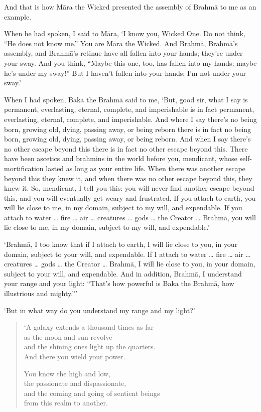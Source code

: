 \documentclass[12pt,openany]{book}%
\begin{document}
And that is how \textsanskrit{Māra} the Wicked presented the assembly of \textsanskrit{Brahmā} to me as an example. 

When he had spoken, I said to \textsanskrit{Māra}, ‘I know you, Wicked One. Do not think, “He does not know me.” You are \textsanskrit{Māra} the Wicked. And \textsanskrit{Brahmā}, \textsanskrit{Brahmā}’s assembly, and \textsanskrit{Brahmā}’s retinue have all fallen into your hands; they’re under your sway. And you think, “Maybe this one, too, has fallen into my hands; maybe he’s under my sway!” But I haven’t fallen into your hands; I’m not under your sway.’ 

When I had spoken, Baka the \textsanskrit{Brahmā} said to me, ‘But, good sir, what I say is permanent, everlasting, eternal, complete, and imperishable is in fact permanent, everlasting, eternal, complete, and imperishable. And where I say there’s no being born, growing old, dying, passing away, or being reborn there is in fact no being born, growing old, dying, passing away, or being reborn. And when I say there’s no other escape beyond this there is in fact no other escape beyond this. There have been ascetics and brahmins in the world before you, mendicant, whose self-mortification lasted as long as your entire life. When there was another escape beyond this they knew it, and when there was no other escape beyond this, they knew it. So, mendicant, I tell you this: you will never find another escape beyond this, and you will eventually get weary and frustrated. If you attach to earth, you will lie close to me, in my domain, subject to my will, and expendable. If you attach to water … fire … air … creatures … gods … the Creator … \textsanskrit{Brahmā}, you will lie close to me, in my domain, subject to my will, and expendable.’ 

‘\textsanskrit{Brahmā}, I too know that if I attach to earth, I will lie close to you, in your domain, subject to your will, and expendable. If I attach to water … fire … air … creatures … gods … the Creator … \textsanskrit{Brahmā}, I will lie close to you, in your domain, subject to your will, and expendable. And in addition, \textsanskrit{Brahmā}, I understand your range and your light: “That’s how powerful is Baka the \textsanskrit{Brahmā}, how illustrious and mighty.”’ 

‘But in what way do you understand my range and my light?’ 

\begin{verse}%
‘A galaxy extends a thousand times as far \\
as the moon and sun revolve \\
and the shining ones light up the quarters. \\
And there you wield your power. 

You know the high and low, \\
the passionate and dispassionate, \\
and the coming and going of sentient beings \\
from this realm to another. 

%
\end{verse}
\end{document}
